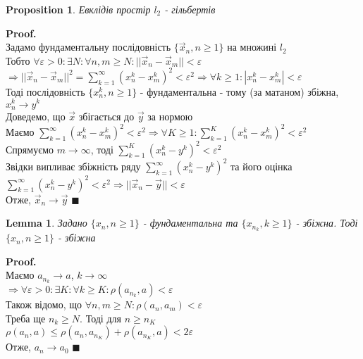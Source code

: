 \documentclass[a4paper, 14pt]{extarticle}
\def\huge{\displaystyle}
\theoremstyle{theoremdd}
\theoremstyle{theoremdd}
\theoremstyle{theoremdd}
\theoremstyle{theoremdd}
\theoremstyle{theoremdd}
\newtheorem{proposition}[theorem]{Proposition}
\theoremstyle{theoremdd}
\theoremstyle{theoremdd}
\newtheorem{lemma}[theorem]{Lemma}
\theoremstyle{theoremdd}
\newenvironment{pf}{\vspace*{-3mm} \textbf{Proof. \\}}{$\blacksquare$}
\begin{document}
\begin{proposition}
Евклідів простір $l_2$ - гільбертів
\end{proposition}

\begin{pf}
Задамо фундаментальну послідовність $\{\vec{x}_n, n \geq 1\}$ на множині $l_2$\\
Тобто $\forall \varepsilon > 0: \exists N: \forall n, m \geq N: ||\vec{x}_n - \vec{x}_m|| < \varepsilon$\\
$\Rightarrow ||\vec{x}_n - \vec{x}_m||^2 = \huge\sum_{k=1}^\infty (x_n^k - x_m^k)^2 < \varepsilon^2 \Rightarrow \forall k \geq 1: |x_n^k - x_m^k| < \varepsilon$\\
Тоді послідовність $\{x_n^k, n \geq 1\}$ - фундаментальна - тому (за матаном) збіжна, $x_n^k \to y^k$\\
Доведемо, що $\vec{x}$ збігається до $\vec{y}$ за нормою\\
Маємо $\huge\sum_{k=1}^\infty (x_n^k - x_m^k)^2 < \varepsilon^2 \Rightarrow \forall K \geq 1: \huge\sum_{k=1}^K (x_n^k - x_m^k)^2 < \varepsilon^2$\\
Спрямуємо $m \to \infty$, тоді $\huge\sum_{k=1}^K (x_n^k - y^k)^2 < \varepsilon^2$\\
Звідки випливає збіжність ряду $\huge\sum_{k=1}^\infty (x_n^k - y^k)^2$ та його оцінка\\
$\huge\sum_{k=1}^\infty (x_n^k - y^k)^2 < \varepsilon^2 \Rightarrow ||\vec{x}_n - \vec{y}|| < \varepsilon$\\
Отже, $\vec{x}_n \to \vec{y}$
\end{pf}
\bigskip \\

\begin{lemma}
Задано $\{x_n, n \geq 1\}$ - фундаментальна та $\{x_{n_k}, k \geq 1\}$ - збіжна. Тоді $\{x_n, n \geq 1\}$ - збіжна
\end{lemma}
\begin{pf}
Маємо $a_{n_k} \to a$, $k \to \infty$\\
$\Rightarrow \forall \varepsilon > 0: \exists K: \forall k \geq K: \rho(a_{n_k}, a) < \varepsilon$\\
Також відомо, що  $\forall n,m \geq N: \rho(a_n,a_m) < \varepsilon$\\
Треба ще $n_k \geq N$. Тоді для $n \geq n_K$\\
$\rho(a_n,a) \leq \rho(a_n,a_{n_K}) + \rho(a_{n_K},a) < 2\varepsilon$\\
Отже, $a_n \to a_0$
\end{pf}
\end{document}
